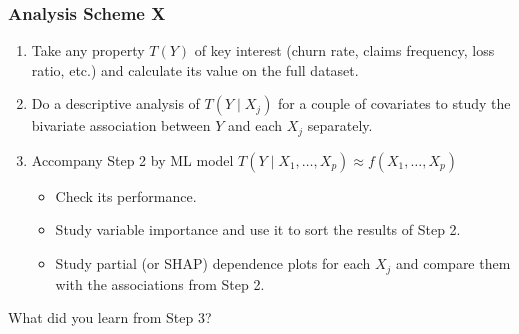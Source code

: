 \documentclass[
    utf8,
    aspectratio=169
]{beamer}  %
\begin{document}
\begin{frame}
	\frametitle{Analysis Scheme X}
	\begin{enumerate}
		\item Take any property $T(Y)$ of key interest (churn rate, claims frequency, loss ratio, etc.) and calculate its value on the full dataset.
		\item Do a descriptive analysis of $T(Y \mid X_j)$ for a couple of covariates to study the bivariate association between $Y$ and each $X_j$ separately.
		\item Accompany Step 2 by ML model $T(Y\mid X_1, \dots, X_p) \approx f(X_1, \dots, X_p)$
			\begin{itemize}
				\item Check its performance.
				\item Study variable importance and use it to sort the results of Step 2.
				\item Study partial (or SHAP) dependence plots for each $X_j$ and compare them with the associations from Step 2.
			\end{itemize}
	\end{enumerate}

	\vfill
	
	\begin{block}{What did you learn from Step 3?}
	\end{block}
\end{frame}

\end{document}
